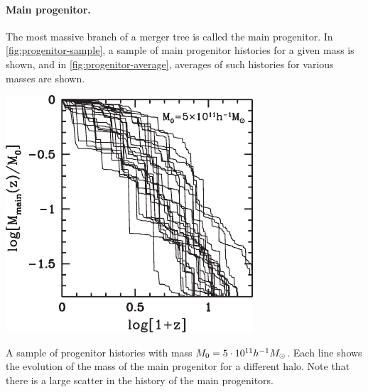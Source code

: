 \paragraph*{Main progenitor.}
The most massive branch of a merger tree is called the main progenitor.
In \cref{fig:progenitor-sample}, a sample of main progenitor histories for a given mass is shown, and in \cref{fig:progenitor-average}, averages of such histories for various masses are shown.

\begin{marginfigure}
	\includegraphics[width=\textwidth]{img/ch-04/progenitor-sample.pdf}
	\caption{A sample of progenitor histories with mass $M_0 = \num{5e11} h^{-1} M_\odot$.
	Each line shows the evolution of the mass of the main progenitor for a different halo.
	Note that there is a large scatter in the history of the main progenitors.}
	\label{fig:progenitor-sample}
\end{marginfigure}

